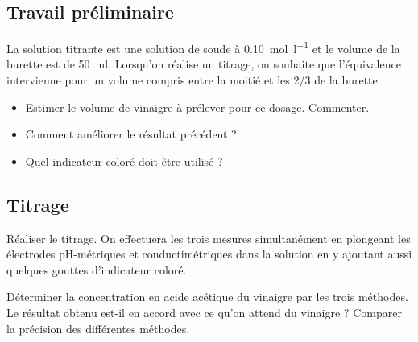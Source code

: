 \documentclass{tp}
\begin{document}
\subsection{Travail préliminaire}%
\label{sub:travail_preliminaire}

La solution titrante est une solution de soude à \SI{0.10}{\mol\per\litre} et le volume de la burette est de \SI{50}{\ml}. Lorsqu'on réalise un titrage, on souhaite que l'équivalence intervienne pour un volume compris entre la moitié et les 2/3 de la burette.

\begin{itemize}
  \item Estimer le volume de vinaigre à prélever pour ce dosage. Commenter. 
  \item Comment améliorer le résultat précédent ?
  \item Quel indicateur coloré doit être utilisé ?
\end{itemize}

\subsection{Titrage}%
\label{sub:titrage}
Réaliser le titrage. On effectuera les trois mesures simultanément en plongeant les électrodes pH-métriques et conductimétriques dans la solution en y ajoutant aussi quelques gouttes d'indicateur coloré.

Déterminer la concentration en acide acétique du vinaigre par les trois méthodes. Le résultat obtenu est-il en accord avec ce qu'on attend du vinaigre ? Comparer la précision des différentes méthodes. 
\end{document}
